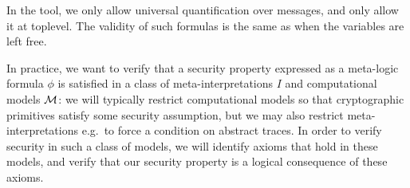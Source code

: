 \begin{remark}
  In the tool, we only allow universal quantification over messages, and
  only allow it at toplevel. The validity of such formulas is the same as
  when the variables are left free.
\end{remark}

In practice, we want to verify that a security property expressed as a
meta-logic formula $\phi$ is satisfied in a class of meta-interpretations
$I$ and computational models $\mathcal{M}$: we will typically restrict computational
models so that cryptographic primitives satisfy some security assumption,
but we may also restrict meta-interpretations e.g.\ to force a condition on
abstract traces. In order to verify security in such a class of models,
we will identify axioms that hold in these models, and verify that our
security property is a logical consequence of these axioms.
